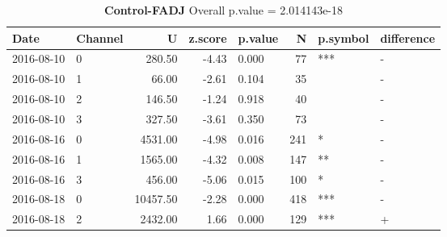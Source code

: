 \begin{table}[ht]
\caption[Control-FADJ]{\textbf{Control-FADJ} Overall p.value = 2.014143e-18}
\centering
\begin{tabular}{llrrlrll}
  \hline
Date & Channel & U & z.score & p.value & N & p.symbol & difference \\ 
  \hline
2016-08-10 & 0 & 280.50 & -4.43 & 0.000 &  77 & *** & - \\ 
  2016-08-10 & 1 & 66.00 & -2.61 & 0.104 &  35 &  & - \\ 
  2016-08-10 & 2 & 146.50 & -1.24 & 0.918 &  40 &  & - \\ 
  2016-08-10 & 3 & 327.50 & -3.61 & 0.350 &  73 &  & - \\ 
  2016-08-16 & 0 & 4531.00 & -4.98 & 0.016 & 241 & * & - \\ 
  2016-08-16 & 1 & 1565.00 & -4.32 & 0.008 & 147 & ** & - \\ 
  2016-08-16 & 3 & 456.00 & -5.06 & 0.015 & 100 & * & - \\ 
  2016-08-18 & 0 & 10457.50 & -2.28 & 0.000 & 418 & *** & - \\ 
  2016-08-18 & 2 & 2432.00 & 1.66 & 0.000 & 129 & *** & + \\ 
   \hline
\end{tabular}
\end{table}